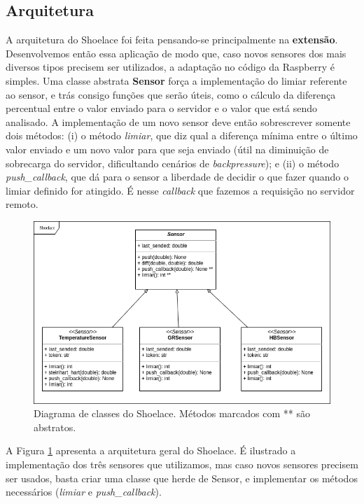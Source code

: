 \subsection{Arquitetura}

A arquitetura do Shoelace foi feita pensando-se principalmente na
\textbf{extensão}. Desenvolvemos então essa aplicação de modo que, caso novos
sensores dos mais diversos tipos precisem ser utilizados, a adaptação no código
da Raspberry é simples. Uma classe abstrata \textbf{Sensor} força a implementação
do limiar referente ao sensor, e trás consigo funções que serão úteis, como o
cálculo da diferença percentual entre o valor enviado para o servidor e o valor
que está sendo analisado. A implementação de um novo sensor deve então
sobrescrever somente dois métodos: (i) o método \textit{limiar}, que diz qual a
diferença mínima entre o último valor enviado e um novo valor para que seja
enviado (útil na diminuição de sobrecarga do servidor, dificultando cenários de
\textit{backpressure}); e (ii) o método \textit{push\_callback}, que dá para o
sensor a liberdade de decidir o que fazer quando o limiar definido for atingido.
É nesse \textit{callback} que fazemos a requisição no servidor remoto.

\begin{figure}
    \begin{center}
        \includegraphics[scale=0.5]{figuras/shoelace.png}
    \end{center}
    \caption{Diagrama de classes do Shoelace. Métodos marcados com ** são
    abstratos.}
    \label{fig:shoelace}
\end{figure}

A Figura \ref{fig:shoelace} apresenta a arquitetura geral do Shoelace. É
ilustrado a implementação dos três sensores que utilizamos, mas caso novos
sensores precisem ser usados, basta criar uma classe que herde de Sensor, e
implementar os métodos necessários (\textit{limiar} e \textit{push\_callback}).
